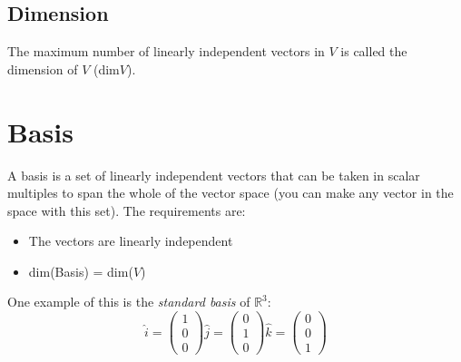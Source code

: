 \subsection{Dimension}
The maximum number of linearly independent vectors in $V$ is called the
dimension of $V$ (dim$V$).

\section{Basis}
A basis is a set of linearly independent vectors that can be taken in scalar
multiples to span the whole of the vector space (you can make any vector in the
space with this set). The requirements are:
\begin{itemize}
	\item The vectors are linearly independent
	\item dim(Basis) = dim($V$)
\end{itemize}
One example of this is the \emph{standard basis} of $\mathbb{R}^3$:
$$
	\hat{i} = \begin{pmatrix}1\\0\\0\end{pmatrix}
	\hat{j} = \begin{pmatrix}0\\1\\0\end{pmatrix}
	\hat{k} = \begin{pmatrix}0\\0\\1\end{pmatrix}
$$


